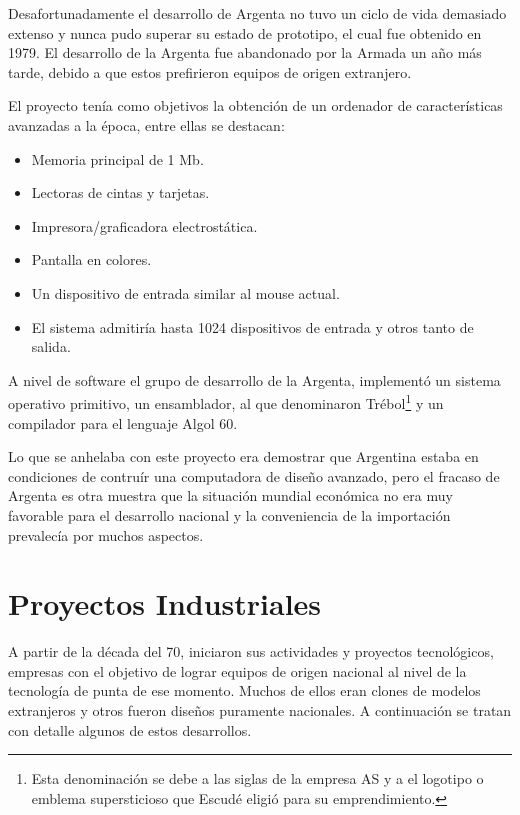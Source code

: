 \documentclass[%
 	final,
%
	notitlepage,
	narroweqnarray,
	inline,
 	twoside,
	]{ieee}
\begin{document}
Desafortunadamente el desarrollo de Argenta no tuvo un ciclo de vida demasiado extenso y nunca pudo superar su estado de prototipo, el cual fue obtenido en 1979. El desarrollo de la Argenta fue abandonado por la Armada un a\~no  m\'as tarde, debido a que estos prefirieron equipos de origen extranjero. 

El proyecto ten\'ia como objetivos la obtenci\'on de un ordenador de caracter\'isticas avanzadas a la \'epoca, entre ellas se destacan:\\
\begin{itemize}
\item Memoria principal de 1 Mb.
\item Lectoras de cintas y tarjetas.
\item Impresora/graficadora electrost\'atica.
\item Pantalla en colores. 
\item Un dispositivo de entrada similar al mouse actual. 
\item El sistema admitir\'ia hasta 1024 dispositivos de entrada y otros tanto de salida.\\
\end{itemize}

A nivel de software el grupo de desarrollo de la Argenta, implement\'o un sistema operativo primitivo, un ensamblador, al que denominaron Tr\'ebol\footnote{Esta denominaci\'on se debe a las siglas de la empresa AS y a el logotipo o emblema supersticioso que Escud\'e eligi\'o para su emprendimiento.} y un compilador para el lenguaje Algol 60.

Lo que se anhelaba con este proyecto era demostrar que Argentina estaba en condiciones de contru\'ir una computadora de dise\~no avanzado, pero el fracaso de Argenta es otra muestra que la situaci\'on mundial econ\'omica no era muy favorable para el desarrollo nacional y la conveniencia de la importaci\'on prevalec\'ia por muchos aspectos.



\section{Proyectos Industriales}
A partir de la d\'ecada del 70, iniciaron sus actividades y proyectos tecnol\'ogicos, empresas con el objetivo de lograr equipos de origen nacional al nivel de la tecnolog\'ia de punta de ese momento. Muchos de ellos eran clones de modelos extranjeros y otros fueron dise\~nos puramente nacionales.
A continuaci\'on se tratan con detalle algunos de estos desarrollos.
\end{document}

